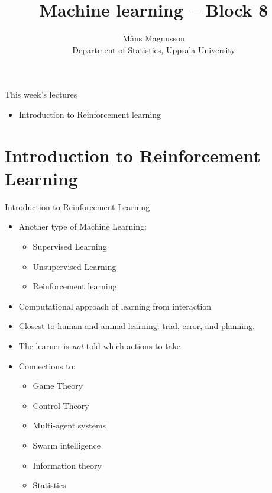 \documentclass[10pt]{beamer}
\title[]{{\color{black}Machine learning -- Block 8}}
\author[]{M{\aa}ns Magnusson\\Department of Statistics, Uppsala University}
\date{\currentsemester}
\begin{document}
\frame{\titlepage
}



\begin{frame}{This week's lectures}
\begin{itemize}
\item Introduction to Reinforcement learning
\end{itemize}
\end{frame}



\section{Introduction to Reinforcement Learning}

\begin{frame}{Introduction to Reinforcement Learning}

\begin{itemize}
\item Another type of Machine Learning:
\begin{itemize}
\item Supervised Learning
\item Unsupervised Learning
\item {\color{uured} Reinforcement learning}
\end{itemize}
\pause
\item Computational approach of {\color{uured} learning from interaction}
\pause
\item Closest to human and animal learning: {\color{uured} trial, error, and planning.}
\pause
\item The learner is \emph{not} told which actions to take
\pause
\item Connections to:
\begin{itemize}
\item Game Theory
\item Control Theory
\item Multi-agent systems
\item Swarm intelligence
\item Information theory
\item Statistics
\end{itemize}
\end{itemize}

\end{frame}
\end{document}
